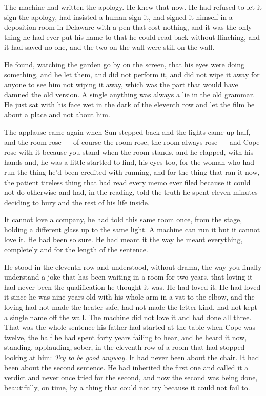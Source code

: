 \documentclass[11pt,openany]{book}
\newcommand{\scenebreak}{\par\vspace{0.5\baselineskip}\begin{center}\textasteriskcentered\quad\textasteriskcentered\quad\textasteriskcentered\end{center}\vspace{0.5\baselineskip}\par}
\begin{document}
The machine had written the apology. He knew that now. He had refused to let it sign the apology, had insisted a human sign it, had signed it himself in a deposition room in Delaware with a pen that cost nothing, and it was the only thing he had ever put his name to that he could read back without flinching, and it had saved no one, and the two on the wall were still on the wall.

He found, watching the garden go by on the screen, that his eyes were doing something, and he let them, and did not perform it, and did not wipe it away for anyone to see him not wiping it away, which was the part that would have damned the old version. A single anything was always a lie in the old grammar. He just sat with his face wet in the dark of the eleventh row and let the film be about a place and not about him.


\scenebreak


The applause came again when Sun stepped back and the lights came up half, and the room rose --- of course the room rose, the room always rose --- and Cope rose with it because you stand when the room stands, and he clapped, with his hands and, he was a little startled to find, his eyes too, for the woman who had run the thing he'd been credited with running, and for the thing that ran it now, the patient tireless thing that had read every memo ever filed because it could not do otherwise and had, in the reading, told the truth he spent eleven minutes deciding to bury and the rest of his life inside.

It cannot love a company, he had told this same room once, from the stage, holding a different glass up to the same light. A machine can run it but it cannot love it. He had been so sure. He had meant it the way he meant everything, completely and for the length of the sentence.

He stood in the eleventh row and understood, without drama, the way you finally understand a joke that has been waiting in a room for two years, that loving it had never been the qualification he thought it was. He had loved it. He had loved it since he was nine years old with his whole arm in a vat to the elbow, and the loving had not made the heater safe, had not made the letter kind, had not kept a single name off the wall. The machine did not love it and had done all three. That was the whole sentence his father had started at the table when Cope was twelve, the half he had spent forty years failing to hear, and he heard it now, standing, applauding, sober, in the eleventh row of a room that had stopped looking at him: \textit{Try to be good anyway.} It had never been about the chair. It had been about the second sentence. He had inherited the first one and called it a verdict and never once tried for the second, and now the second was being done, beautifully, on time, by a thing that could not try because it could not fail to.
\end{document}
